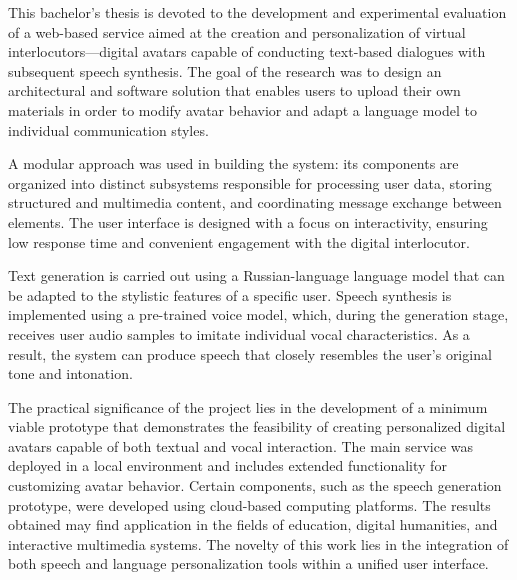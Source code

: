 This bachelor's thesis is devoted to the development and experimental evaluation of a web-based service aimed at the creation and personalization of virtual interlocutors—digital avatars capable of conducting text-based dialogues with subsequent speech synthesis. The goal of the research was to design an architectural and software solution that enables users to upload their own materials in order to modify avatar behavior and adapt a language model to individual communication styles.

A modular approach was used in building the system: its components are organized into distinct subsystems responsible for processing user data, storing structured and multimedia content, and coordinating message exchange between elements. The user interface is designed with a focus on interactivity, ensuring low response time and convenient engagement with the digital interlocutor.

Text generation is carried out using a Russian-language language model that can be adapted to the stylistic features of a specific user. Speech synthesis is implemented using a pre-trained voice model, which, during the generation stage, receives user audio samples to imitate individual vocal characteristics. As a result, the system can produce speech that closely resembles the user’s original tone and intonation.

The practical significance of the project lies in the development of a minimum viable prototype that demonstrates the feasibility of creating personalized digital avatars capable of both textual and vocal interaction. The main service was deployed in a local environment and includes extended functionality for customizing avatar behavior. Certain components, such as the speech generation prototype, were developed using cloud-based computing platforms. The results obtained may find application in the fields of education, digital humanities, and interactive multimedia systems. The novelty of this work lies in the integration of both speech and language personalization tools within a unified user interface.
